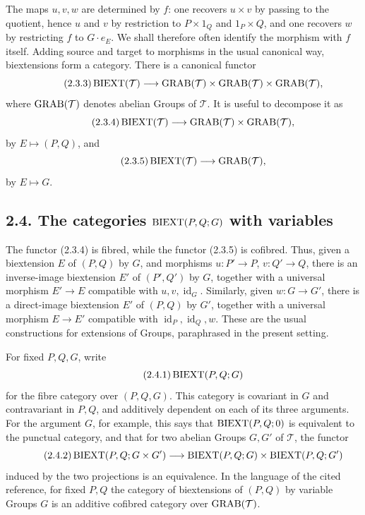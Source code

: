 \documentclass[11pt]{article}
\providecommand{\id}{\operatorname{id}}
\begin{document}
The maps \(u,v,w\) are determined by \(f\): one recovers \(u\times v\) by passing to the quotient, hence \(u\) and \(v\) by restriction to \(P\times1_Q\) and \(1_P\times Q\), and one recovers \(w\) by restricting \(f\) to \(G\cdot e_E\).  We shall therefore often identify the morphism with \(f\) itself.  Adding source and target to morphisms in the usual canonical way, biextensions form a category.  There is a canonical functor
\begin{equation}\qquad\text{(2.3.3)}
  \operatorname{BIEXT}(\mathcal T)\longrightarrow \operatorname{GRAB}(\mathcal T)\times\operatorname{GRAB}(\mathcal T)\times\operatorname{GRAB}(\mathcal T),
\end{equation}
where \(\operatorname{GRAB}(\mathcal T)\) denotes abelian Groups of \(\mathcal T\).  It is useful to decompose it as
\begin{equation}\qquad\text{(2.3.4)}
  \operatorname{BIEXT}(\mathcal T)\longrightarrow\operatorname{GRAB}(\mathcal T)\times\operatorname{GRAB}(\mathcal T),
\end{equation}
by \(E\mapsto(P,Q)\), and
\begin{equation}\qquad\text{(2.3.5)}
  \operatorname{BIEXT}(\mathcal T)\longrightarrow\operatorname{GRAB}(\mathcal T),
\end{equation}
by \(E\mapsto G\).

\subsection*{2.4. The categories \(\operatorname{BIEXT}(P,Q;G)\) with variables}
The functor (2.3.4) is fibred, while the functor (2.3.5) is cofibred.  Thus, given a biextension \(E\) of \((P,Q)\) by \(G\), and morphisms \(u:P'\to P\), \(v:Q'\to Q\), there is an inverse-image biextension \(E'\) of \((P',Q')\) by \(G\), together with a universal morphism \(E'\to E\) compatible with \(u,v,\id_G\).  Similarly, given \(w:G\to G'\), there is a direct-image biextension \(E'\) of \((P,Q)\) by \(G'\), together with a universal morphism \(E\to E'\) compatible with \(\id_P,\id_Q,w\).  These are the usual constructions for extensions of Groups, paraphrased in the present setting.

For fixed \(P,Q,G\), write
\begin{equation}\qquad\text{(2.4.1)}
  \operatorname{BIEXT}(P,Q;G)
\end{equation}
for the fibre category over \((P,Q,G)\).  This category is covariant in \(G\) and contravariant in \(P,Q\), and additively dependent on each of its three arguments.  For the argument \(G\), for example, this says that \(\operatorname{BIEXT}(P,Q;0)\) is equivalent to the punctual category, and that for two abelian Groups \(G,G'\) of \(\mathcal T\), the functor
\begin{equation}\qquad\text{(2.4.2)}
  \operatorname{BIEXT}(P,Q;G\times G')\longrightarrow
  \operatorname{BIEXT}(P,Q;G)\times\operatorname{BIEXT}(P,Q;G')
\end{equation}
induced by the two projections is an equivalence.  In the language of the cited reference, for fixed \(P,Q\) the category of biextensions of \((P,Q)\) by variable Groups \(G\) is an additive cofibred category over \(\operatorname{GRAB}(\mathcal T)\).
\end{document}
